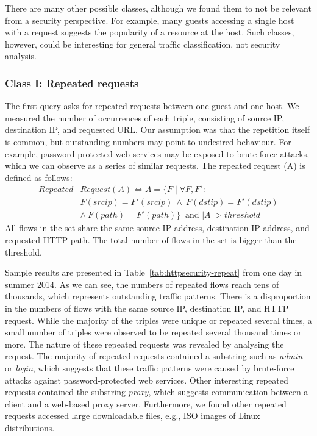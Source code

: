 There are many other possible classes, although we found them to not be relevant from a security perspective. For example, many guests accessing a single host with a request suggests the popularity of a resource at the host. Such classes, however, could be interesting for general traffic classification, not security analysis.

\subsubsection{Class I: Repeated requests}

The first query asks for repeated requests between one guest and one host. We measured the number of occurrences of each triple, consisting of source IP, destination IP, and requested URL. Our assumption was that the repetition itself is common, but outstanding numbers may point to undesired behaviour. For example, password-protected web services may be exposed to brute-force attacks, which we can observe as a series of similar requests. The repeated request (A) is defined as follows:
\begin{equation*}
\begin{split}
Repeated&Request(A) \iff A = \{F \mid \forall F, F':\\
&F(srcip) = F'(srcip) \: \land \: F(dstip) = F'(dstip)\\
&\land \: F(path) = F'(path)\} \: \mbox{ and } |A| > threshold
\end{split}
\end{equation*}
All flows in the set share the same source IP address, destination IP address, and requested HTTP path. The total number of flows in the set is bigger than the threshold.

Sample results are presented in Table~\ref{tab:httpsecurity-repeat} from one day in summer 2014. As we can see, the numbers of repeated flows reach tens of thousands, which represents outstanding traffic patterns. There is a disproportion in the numbers of flows with the same source IP, destination IP, and HTTP request. While the majority of the triples were unique or repeated several times, a small number of triples were observed to be repeated several thousand times or more. The nature of these repeated requests was revealed by analysing the request. The majority of repeated requests contained a substring such as \textit{admin} or \textit{login}, which suggests that these traffic patterns were caused by brute-force attacks against password-protected web services. Other interesting repeated requests contained the substring \textit{proxy}, which suggests communication between a client and a web-based proxy server. Furthermore, we found other repeated requests accessed large downloadable files, e.g., ISO images of Linux distributions.

